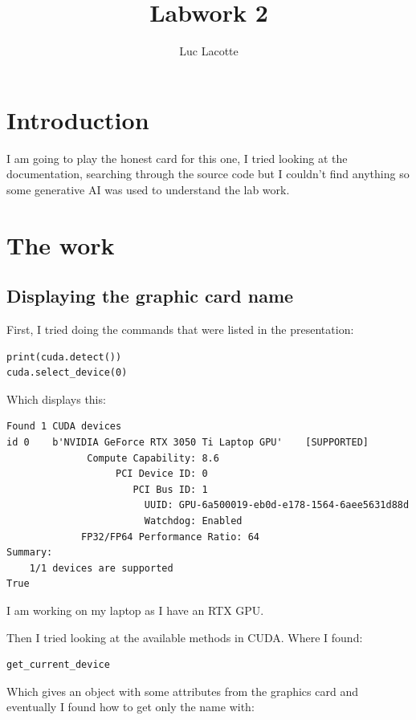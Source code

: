 \documentclass{article}
\title{Labwork 2}
\author{Luc Lacotte}
\begin{document}
\maketitle

\section{Introduction}

I am going to play the honest card for this one, I tried looking at the documentation, searching through the source code but I couldn't find anything so some generative AI was used to understand the lab work.

\section{The work}

\subsection{Displaying the graphic card name}

First, I tried doing the commands that were listed in the presentation:

\begin{lstlisting}
print(cuda.detect())
cuda.select_device(0)
\end{lstlisting}

Which displays this:

\begin{lstlisting}
Found 1 CUDA devices
id 0    b'NVIDIA GeForce RTX 3050 Ti Laptop GPU'    [SUPPORTED]
              Compute Capability: 8.6
                   PCI Device ID: 0
                      PCI Bus ID: 1
                        UUID: GPU-6a500019-eb0d-e178-1564-6aee5631d88d
                        Watchdog: Enabled
             FP32/FP64 Performance Ratio: 64
Summary:
    1/1 devices are supported
True
\end{lstlisting}

I am working on my laptop as I have an RTX GPU.

Then I tried looking at the available methods in CUDA. Where I found:

\begin{lstlisting}
get_current_device
\end{lstlisting}

Which gives an object with some attributes from the graphics card and eventually I found how to get only the name with:
\end{document}
